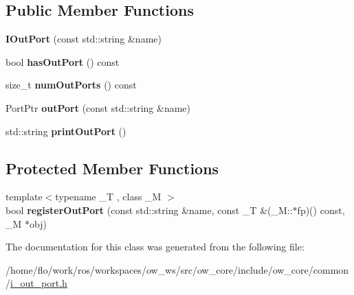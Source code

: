 \subsection*{Public Member Functions}
\begin{DoxyCompactItemize}
\item 
{\bfseries I\+Out\+Port} (const std\+::string \&name)\hypertarget{classow_1_1IOutPort_ad82c87c5ce855fbdf3f690608518e28e}{}\label{classow_1_1IOutPort_ad82c87c5ce855fbdf3f690608518e28e}

\item 
bool {\bfseries has\+Out\+Port} () const \hypertarget{classow_1_1IOutPort_a7f2c656f4b5a9af4e6fad4a38cea61b0}{}\label{classow_1_1IOutPort_a7f2c656f4b5a9af4e6fad4a38cea61b0}

\item 
size\+\_\+t {\bfseries num\+Out\+Ports} () const \hypertarget{classow_1_1IOutPort_a8118d88b62418dbffcbf8caa24a6fa5f}{}\label{classow_1_1IOutPort_a8118d88b62418dbffcbf8caa24a6fa5f}

\item 
Port\+Ptr {\bfseries out\+Port} (const std\+::string \&name)\hypertarget{classow_1_1IOutPort_a4b2295bbde49efb90d5b618359319815}{}\label{classow_1_1IOutPort_a4b2295bbde49efb90d5b618359319815}

\item 
std\+::string {\bfseries print\+Out\+Port} ()\hypertarget{classow_1_1IOutPort_ae722045d5313e88be6438f227591e233}{}\label{classow_1_1IOutPort_ae722045d5313e88be6438f227591e233}

\end{DoxyCompactItemize}
\subsection*{Protected Member Functions}
\begin{DoxyCompactItemize}
\item 
{\footnotesize template$<$typename \+\_\+T , class \+\_\+M $>$ }\\bool {\bfseries register\+Out\+Port} (const std\+::string \&name, const \+\_\+T \&(\+\_\+\+M\+::$\ast$fp)() const, \+\_\+M $\ast$obj)\hypertarget{classow_1_1IOutPort_a487394ed61d099216792ea8f72add7d8}{}\label{classow_1_1IOutPort_a487394ed61d099216792ea8f72add7d8}

\end{DoxyCompactItemize}


The documentation for this class was generated from the following file\+:\begin{DoxyCompactItemize}
\item 
/home/flo/work/ros/workspaces/ow\+\_\+ws/src/ow\+\_\+core/include/ow\+\_\+core/common/\hyperlink{i__out__port_8h}{i\+\_\+out\+\_\+port.\+h}\end{DoxyCompactItemize}
